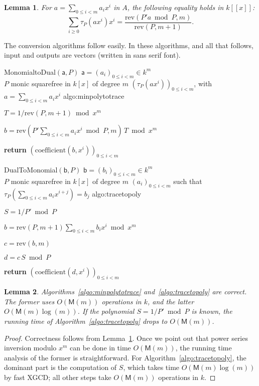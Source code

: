 \documentclass{sig-alternate}
\def\M {\ensuremath{\mathsf{M}}}
\def\va {\ensuremath{\mathsf{a}}}
\def\vb {\ensuremath{\mathsf{b}}}
\def\coeff {\ensuremath{\mathrm{coefficient}}}
\def\rev {\ensuremath{\mathrm{rev}}}
\newcounter{algo}
\newenvironment{algorithm_noendline}[4]{\small\begin{center}\begin{minipage}{0.48\textwidth}
      \refstepcounter{algo}
      \label{#4}
      \sf
      \rule{\textwidth}{0.2pt}\\
      \makebox[\textwidth][c]{Algorithm~\arabic{algo}:~\textbf{#1}}\\
      \rule[0.5\baselineskip]{\textwidth}{0.2pt}\\

      \vspace{-12pt}

      \parbox{\textwidth}{\textbf{Input} #2}
      \parbox{\textwidth}{\textbf{Output} #3}

\vspace{-7pt}

      \begin{enumerate*}}{\end{enumerate*}
      \vspace{-11pt}
\end{minipage}\end{center}
}
\newenvironment{algorithm_endline}[4]{\small\begin{center}\begin{minipage}{0.48\textwidth}
      \refstepcounter{algo}
      \label{#4}
      \sf
      \rule{\textwidth}{0.2pt}\\
      \makebox[\textwidth][c]{Algorithm~\arabic{algo}:~\textbf{#1}}\\
      \rule[0.5\baselineskip]{\textwidth}{0.2pt}\\

      \vspace{-12pt}

      \parbox{\textwidth}{\textbf{Input} #2}
      \parbox{\textwidth}{\textbf{Output} #3}

\vspace{-7pt}

      \begin{enumerate*}}{\end{enumerate*}
      \vspace{-11pt}
      \rule{\textwidth}{0.2pt}
\end{minipage}\end{center}
}
\newtheorem{Lemma}{Lemma}
\begin{document}
\begin{Lemma}\label{lemma:trace:1}
  For $a=\sum_{0 \le i < m} a_i x^i$ in $A$, the following equality
  holds in $k[[x]]$:
  $$\sum_{i \ge 0} \tau_P(a x^i) x^i = \frac{\rev( P' a \bmod P,m)}{\rev(P,m+1)}.$$
\end{Lemma}

The conversion algorithms follow easily. In these algorithms, and all
that follows, input and outputs are vectors (written in {\sf sans
  serif} font).

\begin{algorithm_noendline}
{MonomialtoDual$(\va,P)$}
{$\va=(a_i)_{0 \le i < m} \in k^m$ \\  $P$ monic squarefree in $k[x]$ of degree $m$}
{$(\tau_P(a x^i))_{0 \le i < m}$, with $a=\sum_{0 \le i < m} a_i x^i$}
{algo:minpolytotrace}
\item $T = 1/\rev(P, m+1) \bmod x^m$
\item $b = \rev(P' \sum_{0 \le i < m} a_i x^i \bmod P, m)\, T \bmod x^m$
\item {\bf return} $(\coeff(b,x^i))_{0 \le i < m}$
\end{algorithm_noendline}

\begin{algorithm_endline}
{DualToMonomial$(\vb, P)$}
{$\vb=(b_i)_{0 \le i < m} \in k^m$\\ $P$ monic squarefree in $k[x]$ of degree $m$}
{$(a_i)_{0 \le i < m}$ such that $\tau_P(\sum_{0 \le i < m} a_i x^{i+j}) = b_j$}
{algo:tracetopoly}
\item $S = 1/P' \bmod P$
\item $b= \rev(P,m+1) \sum_{0 \le i < m} b_i x^i \bmod x^m$
\item $c= \rev(b, m)$
\item $d =c\, S \bmod P$
\item {\bf return} $(\coeff(d,x^i))_{0 \le i < m}$
\end{algorithm_endline}

\begin{Lemma}\label{lemma:uniconv}
  Algorithms~\ref{algo:minpolytotrace} and~\ref{algo:tracetopoly} are
  correct. The former uses $O(\M(m))$ operations in $k$, and the
  latter $O(\M(m)\log(m))$.  If the polynomial $S=1/P' \bmod P$ is
  known, the running time of Algorithm~\ref{algo:tracetopoly} drops to
  $O(\M(m))$.
\end{Lemma}
\begin{proof}
  Correctness follows from Lemma~\ref{lemma:trace:1}.  Once we point
  out that power series inversion modulo $x^m$ can be done in time
  $O(\M(m))$, the running time analysis of the former is
  straightforward. For Algorithm~\ref{algo:tracetopoly}, the dominant
  part is the computation of $S$, which takes time $O(\M(m)\log(m))$
  by fast XGCD; all other steps take $O(\M(m))$ operations in $k$.
\end{proof}
\end{document}
